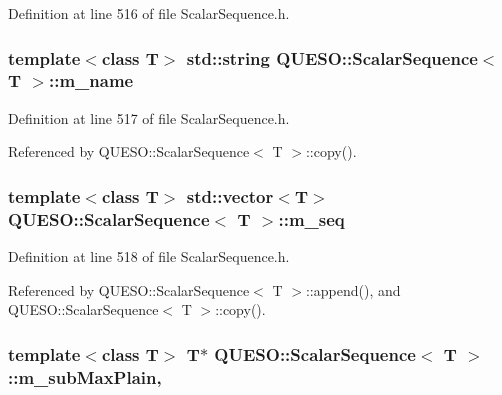 Definition at line 516 of file Scalar\-Sequence.\-h.

\hypertarget{class_q_u_e_s_o_1_1_scalar_sequence_a8568f3ceb7cef2c4e3cf6dbf52d43cdf}{
\subsubsection[{m\-\_\-name}]{\setlength{\rightskip}{0pt plus 5cm}template$<$class T$>$ std\-::string {\bf Q\-U\-E\-S\-O\-::\-Scalar\-Sequence}$<$ T $>$\-::m\-\_\-name\hspace{0.3cm}{\ttfamily [private]}}}\label{class_q_u_e_s_o_1_1_scalar_sequence_a8568f3ceb7cef2c4e3cf6dbf52d43cdf}


Definition at line 517 of file Scalar\-Sequence.\-h.



Referenced by Q\-U\-E\-S\-O\-::\-Scalar\-Sequence$<$ T $>$\-::copy().

\hypertarget{class_q_u_e_s_o_1_1_scalar_sequence_ae616036fd2e62fb69df167814545e893}{
\subsubsection[{m\-\_\-seq}]{\setlength{\rightskip}{0pt plus 5cm}template$<$class T$>$ std\-::vector$<$T$>$ {\bf Q\-U\-E\-S\-O\-::\-Scalar\-Sequence}$<$ T $>$\-::m\-\_\-seq\hspace{0.3cm}{\ttfamily [private]}}}\label{class_q_u_e_s_o_1_1_scalar_sequence_ae616036fd2e62fb69df167814545e893}


Definition at line 518 of file Scalar\-Sequence.\-h.



Referenced by Q\-U\-E\-S\-O\-::\-Scalar\-Sequence$<$ T $>$\-::append(), and Q\-U\-E\-S\-O\-::\-Scalar\-Sequence$<$ T $>$\-::copy().

\hypertarget{class_q_u_e_s_o_1_1_scalar_sequence_ad2b2f7ab227f0be4e9b9a12cb0b76676}{
\subsubsection[{m\-\_\-sub\-Max\-Plain}]{\setlength{\rightskip}{0pt plus 5cm}template$<$class T$>$ T$\ast$ {\bf Q\-U\-E\-S\-O\-::\-Scalar\-Sequence}$<$ T $>$\-::m\-\_\-sub\-Max\-Plain\hspace{0.3cm}{\ttfamily [mutable]}, {\ttfamily [private]}}}\label{class_q_u_e_s_o_1_1_scalar_sequence_ad2b2f7ab227f0be4e9b9a12cb0b76676}


